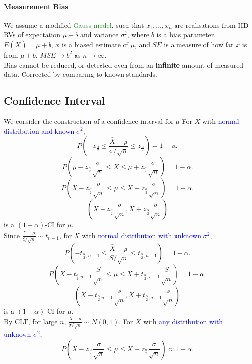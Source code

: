 \paragraph{Measurement Bias}
We assume a modified \textcolor{ForestGreen}{Gauss model}, such that
$x_1,\ldots,x_{n}$ are realisations from IID RVs of expectation $\mu+b$ and
variance $\sigma^{2}$, where $b$ is a bias parameter.\\
$E(\bar{X})=\mu+b$, $\bar{x}$ is a biased estimate of $\mu$, and $SE$ is a
measure of how far $\bar{x}$ is from $\mu+b$. $MSE\to b^{2}$ as $n\to \infty$.\\
\textcolor{Bittersweet}{Bias cannot be reduced, or detected even from an
\textbf{infinite} amount of measured data.} Corrected by comparing to known
standards.

\subsection{Confidence Interval}
We consider the construction of a confidence interval for $\mu$
For $\bar{X}$ with \textcolor{Blue}{normal distribution and known $\sigma^{2}$},
\[P\left( -z_{\frac{\alpha}{2}}\le \frac{\bar{X}-\mu}{\sigma/\sqrt{n}}\le z_{\frac{\alpha}{2}}\right)=1-\alpha.\] 
\[P\left(\mu-z_{\frac{\alpha}{2}}\frac{\sigma}{\sqrt{n}}\le \bar{X}\le \mu+z_{\frac{\alpha}{2}}\frac{\sigma}{\sqrt{n}}\right)=1-\alpha.\]
\[P\left(\bar{X}-z_{\frac{\alpha}{2}}\frac{\sigma}{\sqrt{n}}\le \mu\le \bar{X}+z_{\frac{\alpha}{2}}\frac{\sigma}{\sqrt{n}}\right)=1-\alpha.\]
\[\left(\bar{X}-z_{\frac{\alpha}{2}}\frac{\sigma}{\sqrt{n}}, \bar{X}+z_{\frac{\alpha}{2}}\frac{\sigma}{\sqrt{n}}\right)\]
is a $\left( 1-\alpha \right)$-CI for $\mu$.\\
Since $\frac{\bar{X}-\mu}{S/\sqrt{n}}\sim t_{n-1}$, for $\bar{X}$ with
\textcolor{Blue}{normal distribution with unknown $\sigma^{2}$},
\[P\left(-t_{\frac{\alpha}{2},n-1}\le \frac{\bar{X}-\mu}{S/\sqrt{n}}\le t_{\frac{\alpha}{2},n-1}\right)=1-\alpha.\]
\[P\left(\bar{X}-t_{\frac{\alpha}{2}.n-1}\frac{S}{\sqrt{n}}\le \mu\le \bar{X}+t_{\frac{\alpha}{2},n-1}\frac{S}{\sqrt{n}}\right)=1-\alpha.\] 
\[\left(\bar{X}-t_{\frac{\alpha}{2}.n-1}\frac{s}{\sqrt{n}}, \bar{X}+t_{\frac{\alpha}{2},n-1}\frac{s}{\sqrt{n}}\right)\] 
is a $\left( 1-\alpha \right) $-CI for $\mu$.\\
By CLT, for large $n$, $\frac{\bar{X}-\mu}{\sigma/\sqrt{n}}\sim N(0,1)$. For
$\bar{X}$ with \textcolor{Blue}{any distribution with unknown $\sigma^{2}$},
\[P\left(\bar{X}-z_{\frac{\alpha}{2}}\frac{\sigma}{\sqrt{n}}\le \mu\le \bar{X}+z_{\frac{\alpha}{2}}\frac{\sigma}{\sqrt{n}}\right)\approx1-\alpha.\]
